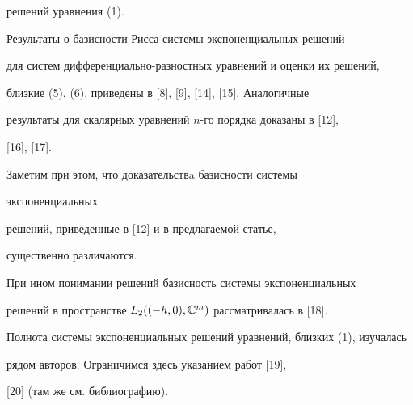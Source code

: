 решений уравнения (1). 


 


Результаты о базисности Рисса системы экспоненциальных решений 


для систем диф\-фе\-рен\-ци\-ально-разностных уравнений и оценки их решений, 


близкие (5), (6), приведены в [8], [9], [14], [15]. Аналогичные 


результаты для скалярных уравнений $n$-го порядка доказаны в [12], 


[16], [17]. 


Заметим при этом, что доказательствa базисности системы 


экспоненциальных 


решений, приведенные в [12] и в предлагаемой статье, 


существенно различаются. 


При ином понимании решений базисность системы экспоненциальных 


решений в пространстве $L_2((-h,0),\Bbb C^m)$ рассматривалась в [18]. 


 


Полнота системы экспоненциальных решений уравнений, близких (1), изучалась 


рядом авторов. Ограничимся здесь указанием работ [19], 


[20] (там же см. библиографию). 


 


